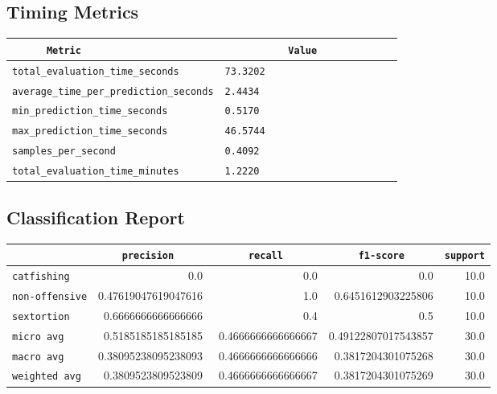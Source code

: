 \documentclass{article}
\begin{document}
\subsection{Timing Metrics}

\begin{center}
\begin{tabular}{l | l} \hline
    \verb|      Metric     | & \verb|           Value           | \\ \hline
    \hline
    \verb|total_evaluation_time_seconds| & \verb|73.3202                      | \\ \hline
    \verb|average_time_per_prediction_seconds| & \verb|2.4434                       | \\ \hline
    \verb|min_prediction_time_seconds| & \verb|0.5170                       | \\ \hline
    \verb|max_prediction_time_seconds| & \verb|46.5744                      | \\ \hline
    \verb|samples_per_second| & \verb|0.4092                       | \\ \hline
    \verb|total_evaluation_time_minutes| & \verb|1.2220                       | \\ \hline
\end{tabular}
\end{center}

\subsection{Classification Report}

\begin{center}
\begin{tabular}{l | r | r | r | r} \hline
    \verb|            | & \verb|    precision     | & \verb|      recall      | & \verb|     f1-score     | & \verb|support| \\ \hline
    \hline
    \verb|catfishing | & 0.0 & 0.0 & 0.0 &    10.0 \\ \hline
    \verb|non-offensive| & 0.47619047619047616 & 1.0 & 0.6451612903225806 &    10.0 \\ \hline
    \verb|sextortion | & 0.6666666666666666 & 0.4 & 0.5 &    10.0 \\ \hline
    \verb|micro avg  | & 0.5185185185185185 & 0.4666666666666667 & 0.49122807017543857 &    30.0 \\ \hline
    \verb|macro avg  | & 0.38095238095238093 & 0.4666666666666666 & 0.3817204301075268 &    30.0 \\ \hline
    \verb|weighted avg| & 0.3809523809523809 & 0.4666666666666667 & 0.3817204301075269 &    30.0 \\ \hline
\end{tabular}
\end{center}
\end{document}
